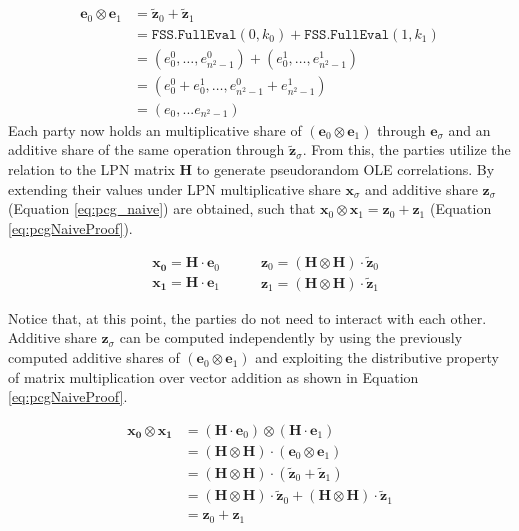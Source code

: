 \begin{equation}
\begin{aligned}
\label{eq:pcgPrimalLPNFssSecretSharing}
\mathbf{e}_0 \otimes \mathbf{e}_1 &= \mathbf{\tilde{z}}_0 + \mathbf{\tilde{z}}_1 \\
&= \texttt{FSS.FullEval}(0, k_0) + \texttt{FSS.FullEval}(1, k_1) \\
&= (e_{0}^0, \ldots, e_{n^2-1}^0) + (e_{0}^1, \ldots, e_{n^2-1}^1) \\
&= (e_{0}^0+e_{0}^1, \ldots, e_{n^2-1}^0+e_{n^2-1}^1) \\
&= (e_0, ... e_{n^2-1})
\end{aligned}
\end{equation}
Each party now holds an multiplicative share of $(\mathbf{e}_0 \otimes \mathbf{e}_1)$ through $\mathbf{e}_\sigma$ and an additive share of the same operation through $\mathbf{\tilde{z}}_\sigma$. From this, the parties utilize the relation to the LPN matrix $\mathbf{H}$ to generate pseudorandom OLE correlations. By extending their values under LPN multiplicative share  $\mathbf{x}_\sigma$ and additive share $\mathbf{z}_\sigma$ (Equation \ref{eq:pcg_naive}) are obtained, such that  $\mathbf{x}_0 \otimes\mathbf{x}_1 = \mathbf{z}_0 + \mathbf{z}_1 $ (Equation \ref{eq:pcgNaiveProof}). 

\begin{equation}
\begin{aligned}
& \mathbf{x_0} = \mathbf{H}\cdot \mathbf{e}_0 \\
& \mathbf{x_1} = \mathbf{H}\cdot \mathbf{e}_1
\end{aligned}
\:\:\:\:\:\: 
\begin{aligned}
&\mathbf{z}_0 = (\mathbf{H}\otimes \mathbf{H}) \cdot \mathbf{\tilde{z}}_0 \\
& \mathbf{z}_1 = (\mathbf{H}\otimes \mathbf{H}) \cdot \mathbf{\tilde{z}}_1
\end{aligned}
\label{eq:pcg_naive}
\end{equation}

Notice that, at this point, the parties do not need to interact with each other. Additive share $\mathbf{z}_\sigma$ can be computed independently by using the previously computed additive shares of  $(\mathbf{e}_0 \otimes \mathbf{e}_1)$ and exploiting the distributive property of matrix multiplication over vector addition as shown in Equation \ref{eq:pcgNaiveProof}.

\begin{equation}    
\begin{aligned}
\mathbf{x_0} \otimes \mathbf{x_1} &= (\mathbf{H}\cdot \mathbf{e}_0)\otimes(\mathbf{H}\cdot \mathbf{e}_1)\\ 
&= (\mathbf{H}\otimes \mathbf{H})\cdot (\mathbf{e}_0 \otimes \mathbf{e}_1)\\
&=(\mathbf{H}\otimes \mathbf{H})\cdot (\mathbf{\tilde{z}}_0 + \mathbf{\tilde{z}}_1) \\
&=(\mathbf{H}\otimes \mathbf{H})\cdot \mathbf{\tilde{z}}_0 + (\mathbf{H}\otimes \mathbf{H})\cdot \mathbf{\tilde{z}}_1 \\
&= \mathbf{z}_0 + \mathbf{z}_1 
\label{eq:pcgNaiveProof}
\end{aligned}
\end{equation}



